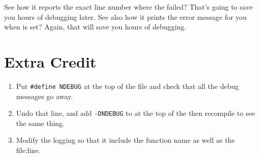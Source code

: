 See how it reports the exact line number where the  failed?
That's going to save you hours of debugging later.  See also how it 
prints the error message for you when  is set? Again,
that will save you hours of debugging.

\section{Extra Credit}

\begin{enumerate}
\item Put \verb|#define NDEBUG| at the top of the file and check that all
    the debug messages go away.
\item Undo that line, and add \verb|-DNDEBUG| to  at the
    top of the  then recompile to see the same thing.
\item Modify the logging so that it include the function name as well
    as the file:line.
\end{enumerate}

